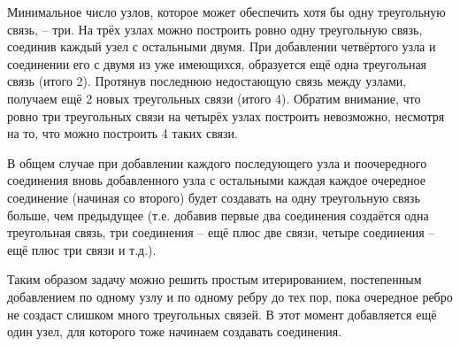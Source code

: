 \solutionSection

Минимальное число узлов, которое может обеспечить хотя бы одну треугольную связь, – три. На трёх узлах можно построить ровно одну треугольную связь, соединив каждый узел с остальными двумя. При добавлении четвёртого узла и соединении его с двумя из уже имеющихся, образуется ещё одна треугольная связь (итого 2). Протянув последнюю недостающую связь между узлами, получаем ещё 2 новых треугольных связи (итого 4). Обратим внимание, что ровно три треугольных связи на четырёх узлах построить невозможно, несмотря на то, что можно построить 4 таких связи.

В общем случае при добавлении каждого последующего узла и поочередного соединения вновь добавленного узла с остальными каждая каждое очередное соединение (начиная со второго) будет создавать на одну треугольную связь больше, чем предыдущее (т.е. добавив первые два соединения создаётся одна треугольная связь, три соединения – ещё плюс две связи, четыре соединения – ещё плюс три связи и т.д.).

Таким образом задачу можно решить простым итерированием, постепенным добавлением по одному узлу и по одному ребру до тех пор, пока очередное ребро не создаст слишком много треугольных связей. В этот момент добавляется ещё один узел, для которого тоже начинаем создавать соединения.

